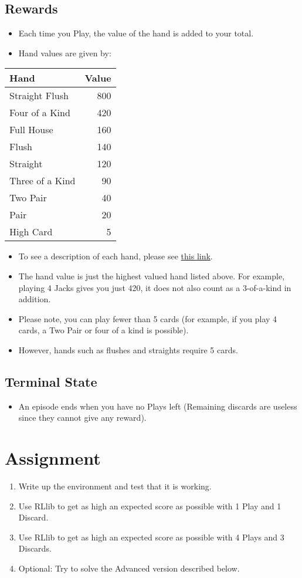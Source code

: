 \documentclass[11pt]{article}
\begin{document}
\subsection{Rewards}
\label{sec:orgbd35e0d}
\begin{itemize}
\item Each time you Play, the value of the hand is added to your total.
\item Hand values are given by:
\end{itemize}
\begin{center}
\begin{tabular}{lr}
Hand & Value\\[0pt]
\hline
Straight Flush & 800\\[0pt]
Four of a Kind & 420\\[0pt]
Full House & 160\\[0pt]
Flush & 140\\[0pt]
Straight & 120\\[0pt]
Three of a Kind & 90\\[0pt]
Two Pair & 40\\[0pt]
Pair & 20\\[0pt]
High Card & 5\\[0pt]
\end{tabular}
\end{center}
\begin{itemize}
\item To see a description of each hand, please see \href{https://www.cardplayer.com/rules-of-poker/hand-rankings}{this link}.
\item The hand value is just the highest valued hand listed above. For example, playing 4 Jacks gives you just 420, it does not also count as a 3-of-a-kind in addition.
\item Please note, you can play fewer than 5 cards (for example, if you play 4 cards, a Two Pair or four of a kind is possible).
\item However, hands such as flushes and straights require 5 cards.
\end{itemize}
\subsection{Terminal State}
\label{sec:org7e8bddf}
\begin{itemize}
\item An episode ends when you have no Plays left (Remaining discards are useless since they cannot give any reward).
\end{itemize}
\section{Assignment}
\label{sec:orgb51db2e}
\begin{enumerate}
\item Write up the environment and test that it is working.
\item Use RLlib to get as high an expected score as possible with 1 Play and 1 Discard.
\item Use RLlib to get as high an expected score as possible with 4 Plays and 3 Discards.
\item Optional:  Try to solve the Advanced version described below.
\end{enumerate}
\end{document}
